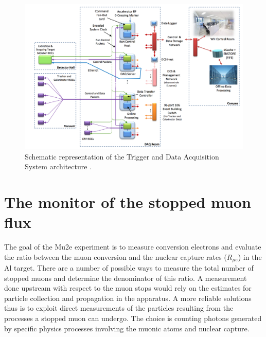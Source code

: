 \documentclass[12pt,a4paper,openright, oneside, titlepage]{book} %
\begin{document}
\begin{figure}[!htb]
\centering
\includegraphics[scale=0.6]{TDAQ}
\caption[Trigger and Data Acquisition System]{Schematic representation of the Trigger and Data Acquisition System architecture \cite{TDAQ}.}
\label{_TDAQ}
\end{figure}

\section{The monitor of the stopped muon flux}
The goal of the Mu2e experiment is to measure conversion electrons and evaluate the ratio between the muon conversion and the nuclear capture rates ($R_{\mu e}$) in the Al target. 
There are a number of possible ways to measure the total number of stopped muons and determine  the denominator of this ratio.
A measurement done upstream with respect to the muon stops would rely on the estimates for particle collection and propagation in the apparatus. 
A more reliable solutions thus is to exploit direct measurements of the particles resulting from the processes a stopped muon can undergo.
The choice is counting photons generated by specific physics processes involving the muonic atoms and nuclear capture.
 
\end{document}
